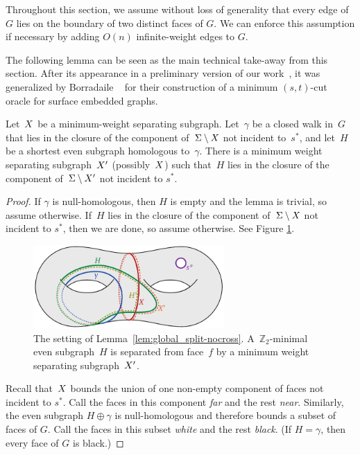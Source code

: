 \documentclass[letterpaper,review]{siamart190516}
\def\Z{\mathbb{Z}}
\begin{document}
{Throughout this section, we assume without loss of generality that every edge of $G$ lies on the boundary of two distinct faces of $G$.  We can enforce this assumption if necessary by adding $O(n)$ infinite-weight edges to $G$.

The following lemma can be seen as the main technical take-away from this section.
After its appearance in a preliminary version of our work~\cite{efn-gmcse-12}, it was
generalized by Borradaile \etal~\cite{benw-amcnt-16} for their construction of a minimum $(s,t)$-cut
oracle for surface embedded graphs.

\begin{lemma}
\label{lem:global_split-nocross}
Let~$X$ be a minimum-weight separating subgraph.
Let~$\gamma$ be a closed walk in~$G$ that lies in the closure of the component of~$\Sigma \setminus
X$ not incident to~$s^*$, and let~$H$
be a shortest even subgraph homologous to~$\gamma$.
There is a minimum weight separating subgraph~$X'$ (possibly~$X$) such
that~$H$ lies in the closure of the component of~$\Sigma \setminus X'$ not incident to $s^*$. 
\end{lemma}

\begin{proof}
If $\gamma$ is null-homologous, then $H$ is empty and the lemma is trivial, so assume otherwise.
If~$H$ lies in the closure of the component of~$\Sigma \setminus X$ not incident to $s^*$, then we are done, so assume otherwise.  See Figure \ref{fig:global_nonsep-vs-shortsep}. 

\begin{figure}[ht]
\centering
\includegraphics[height=1.25in]{Fig/nonsep-vs-shortsep-2}
\caption{The setting of Lemma~\ref{lem:global_split-nocross}. A~$\Z_2$-minimal even subgraph~$H$ is separated from face~$f$ by a minimum weight separating subgraph~$X'$.}
\label{fig:global_nonsep-vs-shortsep}
\end{figure}

Recall that~$X$ bounds the union of one non-empty component of faces not incident to
$s^*$.
Call the faces in this component \emph{far} and the rest \emph{near}.
Similarly, the even subgraph $H \oplus \gamma$ is null-homologous and therefore bounds a subset of
faces of $G$.
Call the faces in this subset \emph{white} and the rest \emph{black}.
(If $H = \gamma$, then every face of $G$ is black.)


\end{proof}}
\end{document}
